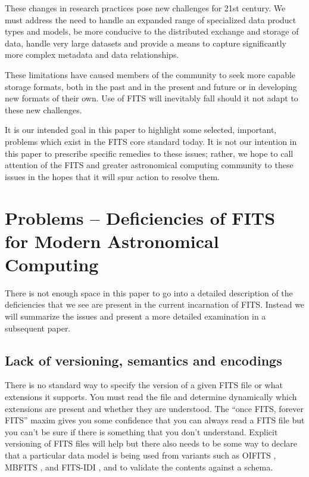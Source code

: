 \documentclass[11pt,twoside]{article}
\begin{document}
These changes in research practices pose new challenges for 21st
century. We must address the need to handle an expanded range of
specialized data product types and models, be more conducive to the
distributed exchange and storage of data, handle very large datasets
and provide a means to capture significantly more complex metadata and
data relationships.

These limitations have caused members of the community to seek more
capable storage formats, both in the past \citep[e.g.\ Starlink
HDS;][]{1982QJRAS..23..485D} and in the present and future
\citep[e.g.\ LOFAR][]{2011ASPC..442...53A} or in developing new
formats of their own. Use of FITS will inevitably fall should it not
adapt to these new challenges.

It is our intended goal in this paper to highlight some selected,
important, problems which exist in the FITS core standard today. It is
not our intention in this paper to prescribe specific remedies to
these issues; rather, we hope to call attention of the FITS and
greater astronomical computing community to these issues in the hopes
that it will spur action to resolve them.

\section{Problems -- Deficiencies of FITS for Modern Astronomical Computing}

There is not enough space in this paper to go into a detailed
description of the deficiencies that we see are present in the current
incarnation of FITS. Instead we will summarize the issues and present
a more detailed examination in a subsequent paper.

\subsection{Lack of versioning, semantics and encodings}

There is no standard way to specify the version of a given FITS file
or what extensions it supports. You must read the file and determine
dynamically which extensions are present and whether they are
understood. The ``once FITS, forever FITS'' maxim gives you some
confidence that you can always read a FITS file but you can't be sure
if there is something that you don't understand. Explicit versioning
of FITS files will help but there also needs to be some way to declare
that a particular data model is being used from variants such as
OIFITS \citep{2006SPIE.6268E.106T}, MBFITS
\citep{2006A&A...454L..25M}, and FITS-IDI \citep{2011AIPS114}, and to
validate the contents against a schema.
\end{document}
